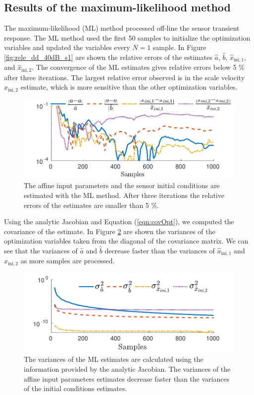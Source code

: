 \subsection{Results of the maximum-likelihood method}
The maximum-likelihood (ML) method processed off-line the sensor transient response.
The ML method used the first 50 samples to initialize the optimization variables and updated the variables every $N = 1$ sample.
In Figure \ref{fig:rele_dd_40dB_s1} are shown the relative errors of the estimates $\widehat{a}$, $\widehat{b}$, $\widehat{x}_{\mathrm{ini,1}}$, and $\widehat{x}_{\mathrm{ini,2}}$.
The convergence of the ML estimates gives relative errors below 5 \% after three iterations.
The largest relative error observed is in the scale velocity $\widehat{x}_{\mathrm{ini,2}}$ estimate, which is more sensitive than the other optimization variables.

\begin{figure}[!htbp]
\centering
\includegraphics[width=\columnwidth]{./ChapterRampInput/fig/Fig_7.pdf} 
\caption{ \label{fig:rele_lo_40dB_s10} The affine input parameters and the sensor initial conditions are estimated with the ML method. After three iterations the relative errors of the estimates are smaller than 5 \%.  }
\end{figure}

Using the analytic Jacobian and Equation (\ref{eqn:covOpt}), we computed the covariance of the estimate.
In Figure \ref{fig:cov_lo_40dB_s1} are shown the variances of the optimization variables taken from the diagonal of the covariance matrix. 
We can see that the variances of $\widehat{a}$ and $\widehat{b}$ decrease faster than the variances of $\widehat{x}_{\mathrm{ini,1}}$ and $\widehat{x}_{\mathrm{ini,2}}$ as more samples are processed.

\begin{figure}[!htbp]
\centering
\includegraphics[width=\columnwidth]{./ChapterRampInput/fig/Fig_8.pdf} 
\caption{ \label{fig:cov_lo_40dB_s1} The variances of the ML estimates are calculated using the information provided by the analytic Jacobian. The variances of the affine input parameters estimates decrease faster than the variances of the initial conditions estimates.  }
\end{figure}

